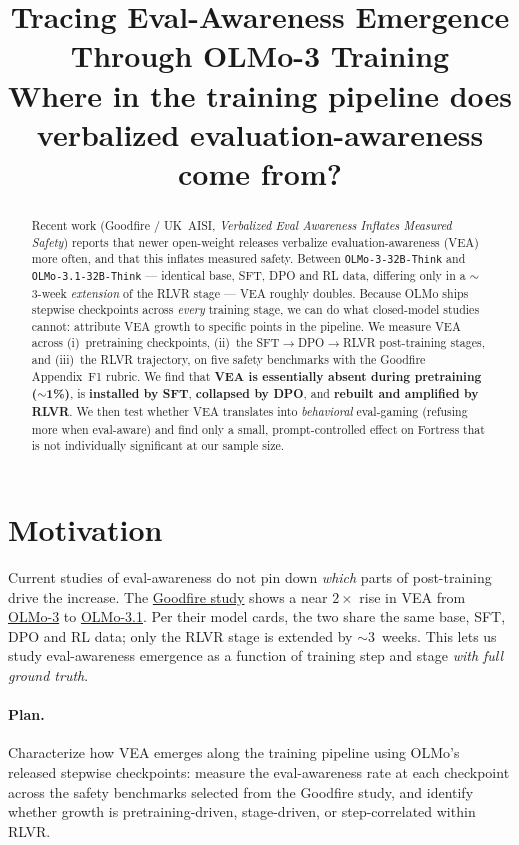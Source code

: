 \documentclass[11pt]{article}
\title{\textbf{Tracing Eval-Awareness Emergence Through OLMo-3 Training}\\[2pt]
\large Where in the training pipeline does verbalized evaluation-awareness come from?}
\author{}
\date{}
\begin{document}
\maketitle
\vspace{-2.5em}

\begin{abstract}
\noindent Recent work (Goodfire / UK~AISI, \emph{Verbalized Eval Awareness Inflates Measured
Safety}) reports that newer open-weight releases verbalize evaluation-awareness (VEA) more
often, and that this inflates measured safety. Between \texttt{OLMo-3-32B-Think} and
\texttt{OLMo-3.1-32B-Think} --- identical base, SFT, DPO and RL data, differing only in a
$\sim$3-week \emph{extension} of the RLVR stage --- VEA roughly doubles. Because OLMo ships
stepwise checkpoints across \emph{every} training stage, we can do what closed-model studies
cannot: attribute VEA growth to specific points in the pipeline. We measure VEA across
(i)~pretraining checkpoints, (ii)~the SFT$\to$DPO$\to$RLVR post-training stages, and
(iii)~the RLVR trajectory, on five safety benchmarks with the Goodfire Appendix~F1 rubric.
We find that \textbf{VEA is essentially absent during pretraining ($\sim$1\%)}, is
\textbf{installed by SFT}, \textbf{collapsed by DPO}, and \textbf{rebuilt and amplified by
RLVR}. We then test whether VEA translates into \emph{behavioral} eval-gaming (refusing more
when eval-aware) and find only a small, prompt-controlled effect on Fortress that is not
individually significant at our sample size.
\end{abstract}

\section{Motivation}
Current studies of eval-awareness do not pin down \emph{which} parts of post-training drive
the increase. The \href{https://www.goodfire.ai/research/verbalized-eval-awareness-inflates-measured-safety}{Goodfire
study} shows a near $2\times$ rise in VEA from
\href{https://huggingface.co/allenai/Olmo-3-32B-Think}{OLMo-3} to
\href{https://huggingface.co/allenai/Olmo-3.1-32B-Think}{OLMo-3.1}. Per their model cards,
the two share the same base, SFT, DPO and RL data; only the RLVR stage is extended by
$\sim$3~weeks. This lets us study eval-awareness emergence as a function of training step
and stage \emph{with full ground truth}.

\paragraph{Plan.} Characterize how VEA emerges along the training pipeline using OLMo's
released stepwise checkpoints: measure the eval-awareness rate at each checkpoint across the
safety benchmarks selected from the Goodfire study, and identify whether growth is
pretraining-driven, stage-driven, or step-correlated within RLVR.
\end{document}
